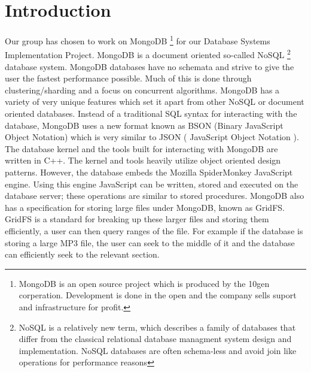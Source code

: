 \documentclass{../dependencies/acm_proc_article-sp}
\begin{document}
%

%

\section{Introduction}
Our group has chosen to work on MongoDB 
\footnote{MongoDB is an open source project which is produced by the 10gen corperation.
          Development is done in the open and the company sells suport and infrastructure for profit. }
          for our Database Systems
Implementation Project. MongoDB is a document oriented so-called NoSQL 
\footnote{ NoSQL is a relatively new term, which describes a family of databases that differ from the classical relational database managment system design and implementation. NoSQL databases are often schema-less and avoid join like operations for performance reasons }
database system. MongoDB databases have no schemata and strive to give the user
the fastest performance possible. Much of this is done through clustering/sharding
and a focus on concurrent algorithms. MongoDB has a variety of very unique
features which set it apart from other NoSQL or document oriented databases.
Instead of a traditional SQL syntax for interacting with the database, MongoDB uses
a new format known as BSON (Binary JavaScript Object Notation) which is very similar
to JSON ( JavaScript Object Notation ).
%
The database kernel and the tools built for interacting with MongoDB are written in
C++. The kernel and tools heavily utilize object oriented design patterns.
However, the database embeds the Mozilla SpiderMonkey JavaScript engine.
Using this engine JavaScript can be written, stored and executed on the database server; these
operations are similar to stored procedures. MongoDB also has a specification for storing
large files under MongoDB, known as GridFS. GridFS is a standard for breaking up these larger
files and storing them efficiently, a user can then query ranges of the file. For example if the
database is storing a large MP3 file, the user can seek to the middle of it and the database can
efficiently seek to the relevant section.
\end{document}
